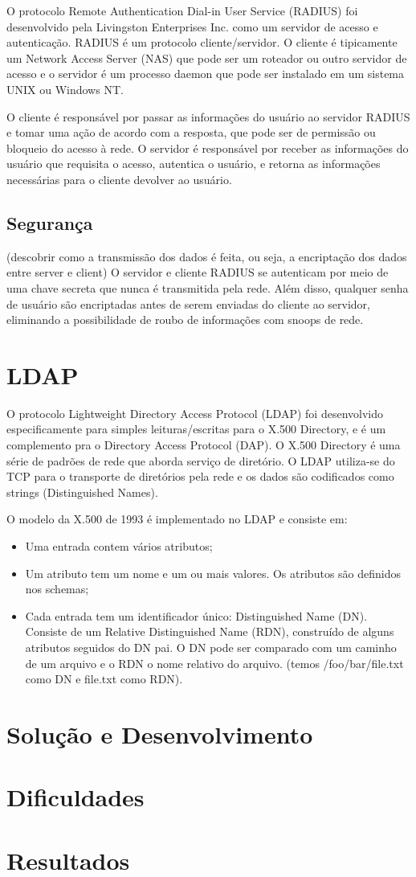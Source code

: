 O protocolo Remote Authentication Dial-in User Service (RADIUS) foi desenvolvido pela
Livingston Enterprises Inc. como um servidor de acesso e autenticação. RADIUS é um
protocolo cliente/servidor. O cliente é tipicamente um Network Access Server (NAS) que
pode ser um roteador ou outro servidor de acesso e o servidor é um processo daemon que
pode ser instalado em um sistema UNIX ou Windows NT.

O cliente é responsável por passar as informações do usuário ao servidor RADIUS e tomar
uma ação de acordo com a resposta, que pode ser de permissão ou bloqueio do acesso à rede.
O servidor é responsável por receber as informações do usuário que requisita o acesso,
autentica o usuário, e retorna as informações necessárias para o cliente devolver ao usuário.

\subsection{Segurança}

(descobrir como a transmissão dos dados é feita, ou seja, a encriptação dos dados entre
server e client)
O servidor e cliente RADIUS se autenticam por meio de uma chave secreta que nunca é
transmitida pela rede. Além disso, qualquer senha de usuário são encriptadas antes de
serem enviadas do cliente ao servidor, eliminando a possibilidade de roubo de informações
com snoops de rede.

\section{LDAP}

O protocolo Lightweight Directory Access Protocol (LDAP) foi desenvolvido especificamente
para simples leituras/escritas para o X.500 Directory, e é um complemento pra o Directory
Access Protocol (DAP). O X.500 Directory é uma série de padrões de rede que aborda serviço
de diretório. O LDAP utiliza-se do TCP para o transporte de diretórios pela rede e os dados
são codificados como strings (Distinguished Names).

O modelo da X.500 de 1993 é implementado no LDAP e consiste em:
\begin{itemize}
  \item Uma entrada contem vários atributos;
  \item Um atributo tem um nome e um ou mais valores. Os atributos são definidos nos schemas;
  \item Cada entrada tem um identificador único: Distinguished Name (DN). Consiste de um
    Relative Distinguished Name (RDN), construído de alguns atributos seguidos do DN pai.
    O DN pode ser comparado com um caminho de um arquivo e o RDN o nome relativo do arquivo.
    (temos /foo/bar/file.txt como DN e file.txt como RDN).
\end{itemize}

\section{Solução e Desenvolvimento}

\section{Dificuldades}

\section{Resultados}

